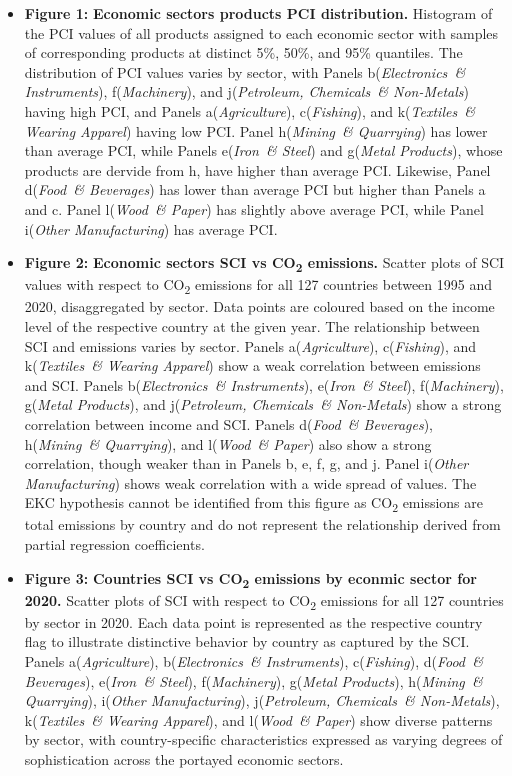 \documentclass[10pt]{article}
\newcommand{\AG}{\textit{Agriculture}}
\newcommand{\EL}{\textit{Electronics~\& Instruments}}
\newcommand{\FI}{\textit{Fishing}}
\newcommand{\FO}{\textit{Food~\& Beverages}}
\newcommand{\IR}{\textit{Iron~\& Steel}}
\newcommand{\MA}{\textit{Machinery}}
\newcommand{\ME}{\textit{Metal Products}}
\newcommand{\MI}{\textit{Mining~\& Quarrying}}
\newcommand{\OT}{\textit{Other Manufacturing}}
\newcommand{\PE}{\textit{Petroleum, Chemicals~\& Non-Metals}}
\newcommand{\TE}{\textit{Textiles~\& Wearing Apparel}}
\newcommand{\WO}{\textit{Wood~\& Paper}}
\begin{document}
\begin{itemize}
      \item \textbf{Figure 1:} \textbf{Economic sectors products PCI distribution.} Histogram of the PCI values of all products assigned to each economic sector with samples of corresponding products at distinct 5\%, 50\%, and 95\% quantiles. The distribution of PCI values varies by sector, with Panels b(\EL), f(\MA), and j(\PE) having high PCI, and Panels a(\AG), c(\FI), and k(\TE) having low PCI. Panel h(\MI) has lower than average PCI, while Panels e(\IR) and g(\ME), whose products are dervide from h, have higher than average PCI. Likewise, Panel d(\FO) has lower than average PCI but higher than Panels a and c. Panel l(\WO) has slightly above average PCI, while Panel i(\OT) has average PCI.
      \item \textbf{Figure 2:} \textbf{Economic sectors SCI vs CO\textsubscript{2} emissions.} Scatter plots of SCI values with respect to CO\textsubscript{2} emissions for all 127 countries between 1995 and 2020, disaggregated by sector. Data points are coloured based on the income level of the respective country at the given year. The relationship between SCI and emissions varies by sector. Panels a(\AG), c(\FI), and k(\TE) show a weak correlation between emissions and SCI. Panels b(\EL), e(\IR), f(\MA), g(\ME), and j(\PE) show a strong correlation between income and SCI. Panels d(\FO), h(\MI), and l(\WO) also show a strong correlation, though weaker than in Panels b, e, f, g, and j. Panel i(\OT) shows weak correlation with a wide spread of values. The EKC hypothesis cannot be identified from this figure as CO\textsubscript{2} emissions are total emissions by country and do not represent the relationship derived from partial regression coefficients.
      \item \textbf{Figure 3:} \textbf{Countries SCI vs CO\textsubscript{2} emissions by econmic sector for 2020.} Scatter plots of SCI with respect to CO\textsubscript{2} emissions for all 127 countries by sector in 2020. Each data point is represented as the respective country flag to illustrate distinctive behavior by country as captured by the SCI. Panels a(\AG), b(\EL), c(\FI), d(\FO), e(\IR), f(\MA), g(\ME), h(\MI), i(\OT), j(\PE), k(\TE), and l(\WO) show diverse patterns by sector, with country-specific characteristics expressed as varying degrees of sophistication across the portayed economic sectors.
\end{itemize}

% 
\end{document}
